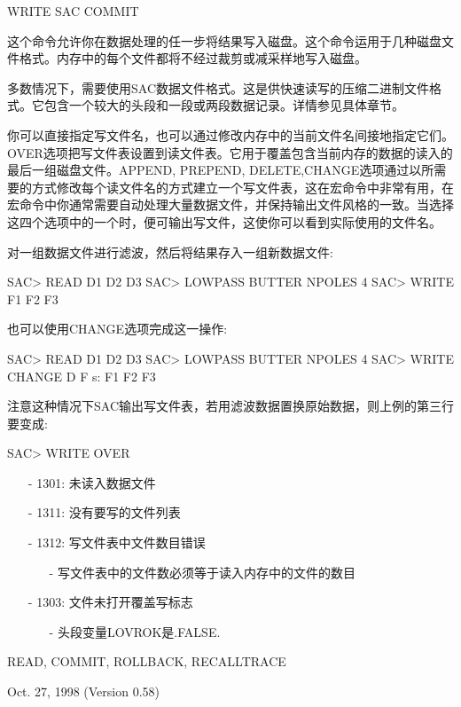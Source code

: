 WRITE SAC COMMIT

这个命令允许你在数据处理的任一步将结果写入磁盘。这个命令运用于几种磁盘文件格式。内存中的每个文件都将不经过裁剪或减采样地写入磁盘。

多数情况下，需要使用SAC数据文件格式。这是供快速读写的压缩二进制文件格式。它包含一个较大的头段和一段或两段数据记录。详情参见具体章节。

你可以直接指定写文件名，也可以通过修改内存中的当前文件名间接地指定它们。OVER选项把写文件表设置到读文件表。它用于覆盖包含当前内存的数据的读入的最后一组磁盘文件。APPEND, PREPEND, DELETE,CHANGE选项通过以所需要的方式修改每个读文件名的方式建立一个写文件表，这在宏命令中非常有用，在宏命令中你通常需要自动处理大量数据文件，并保持输出文件风格的一致。当选择这四个选项中的一个时，便可输出写文件，这使你可以看到实际使用的文件名。

对一组数据文件进行滤波，然后将结果存入一组新数据文件:
\begin{SACCode}
SAC> READ D1 D2 D3
SAC> LOWPASS BUTTER NPOLES 4
SAC> WRITE F1 F2 F3
\end{SACCode}

也可以使用CHANGE选项完成这一操作:
\begin{SACCode}
SAC> READ D1 D2 D3
SAC> LOWPASS BUTTER NPOLES 4
SAC> WRITE CHANGE D F
s:  F1 F2 F3
\end{SACCode}

注意这种情况下SAC输出写文件表，若用滤波数据置换原始数据，则上例的第三行要变成:
\begin{SACCode}
SAC> WRITE OVER
\end{SACCode}

\begin{itemize}
\item[-]1301: 未读入数据文件
\item[-]1311: 没有要写的文件列表
\item[-]1312: 写文件表中文件数目错误
	\begin{itemize}
	\item[-]写文件表中的文件数必须等于读入内存中的文件的数目
	\end{itemize}
\item[-]1303: 文件未打开覆盖写标志
	\begin{itemize}
	\item[-]头段变量LOVROK是.FALSE. 
	\end{itemize}
\end{itemize}

READ, COMMIT, ROLLBACK, RECALLTRACE

Oct. 27, 1998 (Version 0.58)
